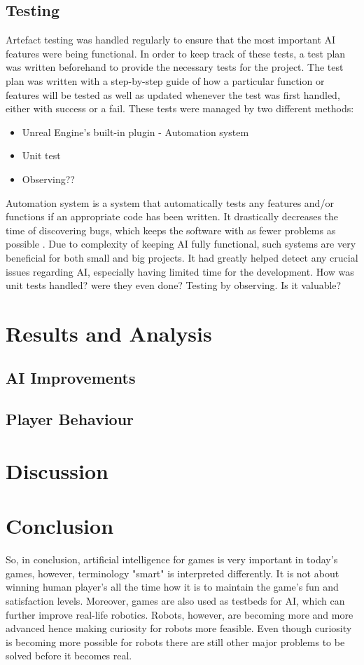 \documentclass[journal]{IEEEtran}
\begin{document}
\subsection{Testing} \label{testing} %
Artefact testing was handled regularly to ensure that the most important AI features were being functional. In order to keep track of these tests, a test plan was written beforehand to provide the necessary tests for the project. The test plan was written with a step-by-step guide of how a particular function or features will be tested as well as updated whenever the test was first handled, either with success or a fail. These tests were managed by two different methods: 
\begin{itemize}
	\item Unreal Engine's built-in plugin - Automation system
	\item Unit test
	\item Observing??
\end{itemize}
Automation system is a system that automatically tests any features and/or functions if an appropriate code has been written. It drastically decreases the time of discovering bugs, which keeps the software with as fewer problems as possible \cite{automation}. Due to complexity of keeping AI fully functional, such systems are very beneficial for both small and big projects. It had greatly helped detect any crucial issues regarding AI, especially having limited time for the development.
How was unit tests handled? were they even done?
Testing by observing. Is it valuable?

\section{Results and Analysis}
\subsection{AI Improvements}

\subsection{Player Behaviour}

\section{Discussion}

\section{Conclusion} %
So, in conclusion, artificial intelligence for games is very important in today's games, however, terminology "smart" is interpreted differently. It is not about winning human player's all the time how it is to maintain the game's fun and satisfaction levels. Moreover, games are also used as testbeds for AI, which can further improve real-life robotics. Robots, however, are becoming more and more advanced hence making curiosity for robots more feasible. Even though curiosity is becoming more possible for robots there are still other major problems to be solved before it becomes real.
\end{document}
